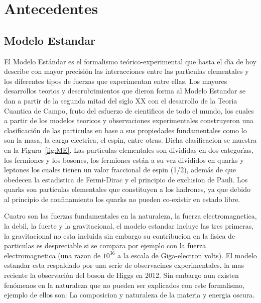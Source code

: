 \chapter{Antecedentes}

\section{Modelo Estandar}

El Modelo Est\'andar es el formalismo te\'orico-experimental que hasta el d\'{\i}a de hoy  describe con mayor precisi\'on las interacciones entre las part\'{\i}culas elementales y los diferentes tipos de fuerzas que experimentan entre ellas. Los mayores desarrollos teorios y descrubrimientos que dieron forma al Modelo Estandar se dan a partir de la segunda mitad del siglo XX con el desarrollo de la Teoria Cuantica de Campo, fruto del esfuerzo de cientificos de todo el mundo, los cuales a partir de los modelos teoricos y observaciones experimentales construyeron una clasificaci\'on de las particulas en base a sus propiedades fundamentales como lo son la masa, la carga electrica, el espin, entre otras. Dicha clasificacion se muestra en la Figura~\ref{fig:ME}. Las part\'{\i}culas elementales son divididas en dos categor\'{\i}as, los fermiones y los bosones, los fermiones est\'an a su vez divididos en quarks y leptones los cuales tienen un valor fraccional de espin (1/2), adem\'as de que obedecen la estadistica de Fermi-Dirac y el principio de exclusion de Pauli. Los quarks son particulas elementales que constituyen a los hadrones, ya que debido al principio de confinamiento los quarks no pueden co-existir en estado libre.

Cuatro son las fuerzas fundamentales en la naturaleza, la fuerza electromagnetica, la debil, la fuerte y la gravitacional, el modelo estandar incluye las tres primeras, la gravitacional no esta incluida sin embargo su contribucion en la fisica de particulas es despreciable si se compara por ejemplo con la fuerza electromagnetica (una razon de $10^{36}$ a la escala de Giga-electron volts). El modelo estandar esta respaldado por una serie de observacines experimentales, la mas reciente la observaci\'on del boson de Higgs en 2012. Sin embargo aun existen fen\'omenos en la naturaleza que no pueden ser explicados con este formalismo, ejemplo de ellos son: La composicion y naturaleza de la materia y energia oscura.

